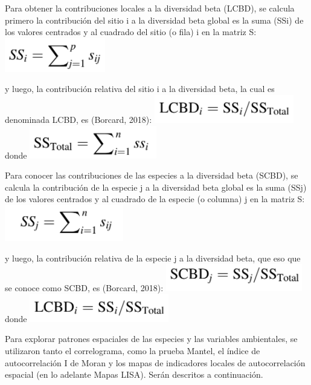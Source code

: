 \documentclass[11pt,]{article}
\begin{document}
Para obtener la contribuciones locales a la diversidad beta (LCBD), se
calcula primero la contribución del sitio i a la diversidad beta global
es la suma (SSi) de los valores centrados y al cuadrado del sitio (o
fila) i en la matriz S: \includegraphics{beta_local.PNG}

y luego, la contribución relativa del sitio i a la diversidad beta, la
cual es denominada LCBD, es (Borcard, 2018):
\includegraphics{beta_especies.png} donde
\includegraphics{beta_local2.PNG}

Para conocer las contribuciones de las especies a la diversidad beta
(SCBD), se calcula la contribución de la especie j a la diversidad beta
global es la suma (SSj) de los valores centrados y al cuadrado de la
especie (o columna) j en la matriz S:
\includegraphics{beta_especies1.PNG}

y luego, la contribución relativa de la especie j a la diversidad beta,
que eso que se conoce como SCBD, es (Borcard, 2018):
\includegraphics{beta_especies2.PNG} donde
\includegraphics{beta_especies.png}

Para explorar patrones espaciales de las especies y las variables
ambientales, se utilizaron tanto el correlograma, como la prueba Mantel,
el índice de autocorrelación I de Moran y los mapas de indicadores
locales de autocorrelación espacial (en lo adelante Mapas LISA). Serán
descritos a continuación.
\end{document}
